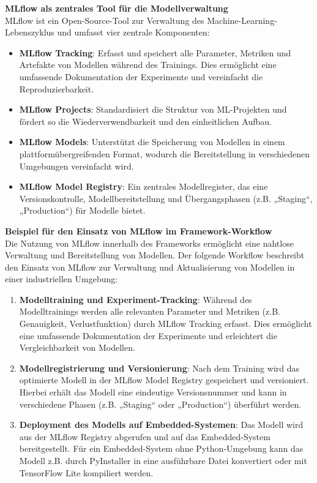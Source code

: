\begin{description}
\textbf{MLflow als zentrales Tool für die Modellverwaltung} \\
MLflow ist ein Open-Source-Tool zur Verwaltung des Machine-Learning-Lebenszyklus und umfasst vier zentrale Komponenten:
\begin{itemize}
    \item \textbf{MLflow Tracking}: Erfasst und speichert alle Parameter, Metriken und Artefakte von Modellen während des Trainings. Dies ermöglicht eine umfassende Dokumentation der Experimente und vereinfacht die Reproduzierbarkeit.
    \item \textbf{MLflow Projects}: Standardisiert die Struktur von ML-Projekten und fördert so die Wiederverwendbarkeit und den einheitlichen Aufbau.
    \item \textbf{MLflow Models}: Unterstützt die Speicherung von Modellen in einem plattformübergreifenden Format, wodurch die Bereitstellung in verschiedenen Umgebungen vereinfacht wird.
    \item \textbf{MLflow Model Registry}: Ein zentrales Modellregister, das eine Versionskontrolle, Modellbereitstellung und Übergangsphasen (z.B. „Staging“, „Production“) für Modelle bietet.
\end{itemize}

\textbf{Beispiel für den Einsatz von MLflow im Framework-Workflow} \\
Die Nutzung von MLflow innerhalb des Frameworks ermöglicht eine nahtlose Verwaltung und Bereitstellung von Modellen. Der folgende Workflow beschreibt den Einsatz von MLflow zur Verwaltung und Aktualisierung von Modellen in einer industriellen Umgebung:

\begin{enumerate}
    \item \textbf{Modelltraining und Experiment-Tracking}:
    Während des Modelltrainings werden alle relevanten Parameter und Metriken (z.B. Genauigkeit, Verlustfunktion) durch MLflow Tracking erfasst. Dies ermöglicht eine umfassende Dokumentation der Experimente und erleichtert die Vergleichbarkeit von Modellen.

    \item \textbf{Modellregistrierung und Versionierung}:
    Nach dem Training wird das optimierte Modell in der MLflow Model Registry gespeichert und versioniert. Hierbei erhält das Modell eine eindeutige Versionsnummer und kann in verschiedene Phasen (z.B. „Staging“ oder „Production“) überführt werden.

    \item \textbf{Deployment des Modells auf Embedded-Systemen}:
    Das Modell wird aus der MLflow Registry abgerufen und auf das Embedded-System bereitgestellt. Für ein Embedded-System ohne Python-Umgebung kann das Modell z.B. durch PyInstaller in eine ausführbare Datei konvertiert oder mit TensorFlow Lite kompiliert werden.


\end{enumerate}
\end{description}
